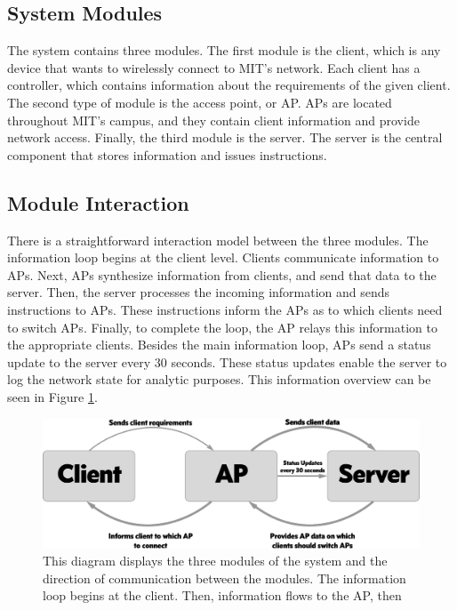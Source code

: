 \documentclass[10pt,journal,compsoc]{IEEEtran}
\begin{document}
		\subsection{System Modules}
		The system contains three modules. The first module is the client, which is any device that wants to wirelessly connect to MIT's network. Each client has a controller, which contains information about the requirements of the given client. The second type of module is the access point, or AP. APs are located throughout MIT's campus, and they contain client information and provide network access. Finally, the third module is the server. The server is the central component that stores information and issues instructions.
		
		\subsection{Module Interaction}
		There is a straightforward interaction model between the three modules. The information loop begins at the client level. Clients communicate information to APs. Next, APs synthesize information from clients, and send that data to the server. Then, the server processes the incoming information and sends instructions to APs. These instructions inform the APs as to which clients need to switch APs. Finally, to complete the loop, the AP relays this information to the appropriate clients. Besides the main information loop, APs send a status update to the server every 30 seconds. These status updates enable the server to log the network state for analytic purposes. This information overview can be seen in Figure \ref{fig:overview}. 
		
        \begin{figure}
            \includegraphics[width=\linewidth]{overviewDiagram.png}
            \caption{This diagram displays the three modules of the system and the direction of communication between the modules. The information loop begins at the client. Then, information flows to the AP, then }
            \label{fig:overview}
        \end{figure}
		
\end{document}
